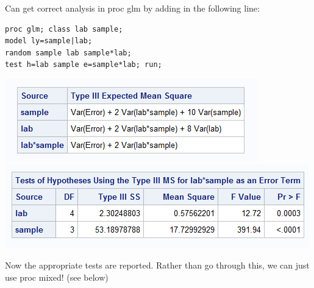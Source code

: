 Can get correct analysis in proc glm by adding in the following line:

\begin{small}
\begin{verbatim}
proc glm; class lab sample;
model ly=sample|lab;
random sample lab sample*lab; 
test h=lab sample e=sample*lab; run;
\end{verbatim}
\end{small}

\begin{center}
\includegraphics[scale=0.7]{MilkGLM3}\includegraphics[scale=0.7]{MilkGLM4}
\end{center}

Now the appropriate tests are reported.  Rather than go through this, we can just use proc mixed! (see below)\\~\\

